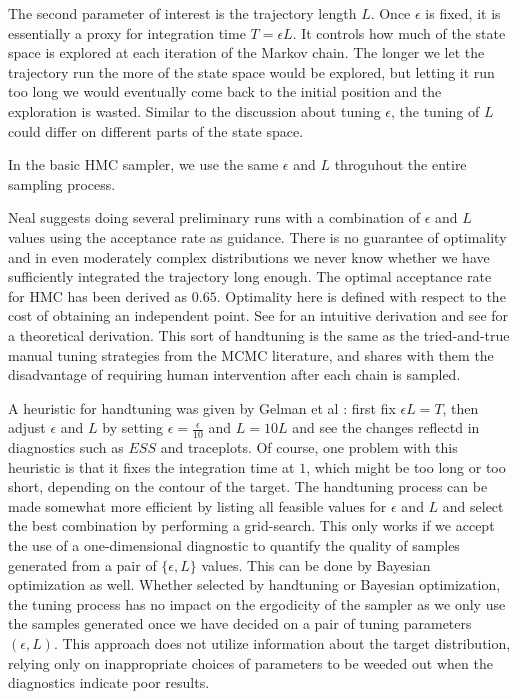 \documentclass[]{report}
\begin{document}
The second parameter of interest is the trajectory length $L$. Once $\epsilon$ is fixed, it is essentially a proxy for integration time $T= \epsilon L$. It controls how much of the state space is explored at each iteration of the Markov chain. The longer we let the trajectory run the more of the state space would be explored, but letting it run too long we would eventually come back to the initial position and the exploration is wasted. Similar to the discussion about tuning $\epsilon$, the tuning of $L$ could differ on different parts of the state space. 

In the basic HMC sampler, we use the same $\epsilon$ and $L$ throguhout the
entire sampling process.  

Neal suggests doing several preliminary runs with a combination of $\epsilon$ and $L$ values using the acceptance rate as guidance. There is no guarantee of optimality and in even moderately complex distributions we never know whether we have sufficiently integrated the trajectory long enough. The optimal acceptance rate for HMC has been derived as $0.65$. Optimality here is defined with respect to the cost of obtaining an independent point. See \cite{neal2011mcmc} for an intuitive derivation and see \cite{beskos2013optimal} for a theoretical derivation. This sort of handtuning is the same as the tried-and-true manual tuning strategies from the MCMC literature, and shares with them the disadvantage of requiring human intervention after each chain is sampled. 

A heuristic for handtuning was given by Gelman et al
\cite{gelman2014bayesian}: first fix $\epsilon L = T$, then adjust $\epsilon$
and $L$ by setting $\epsilon = \frac{\epsilon}{10} $ and $L = 10L$ and see the
changes reflectd in diagnostics such as $ESS$ and traceplots. Of course, one
problem with this heuristic is that it fixes the integration time at $1$, which
might be too long or too short, depending on the contour of the target. The handtuning process can be made somewhat more efficient by listing all feasible values
for $\epsilon$ and $L$ and select the best combination by performing a grid-search. This only works if we accept
the use of a one-dimensional diagnostic to quantify the quality of samples
generated from a pair of $\{\epsilon,L\}$ values. This can be done by Bayesian
optimization as well. Whether selected by handtuning or Bayesian optimization,
the tuning process has no impact on the ergodicity of the sampler as we only
use the samples generated once we have decided on a pair of tuning parameters
$(\epsilon,L)$. This approach does not utilize information about the target
distribution, relying only on inappropriate choices of parameters to be weeded
out when the diagnostics indicate poor results.
\end{document}

